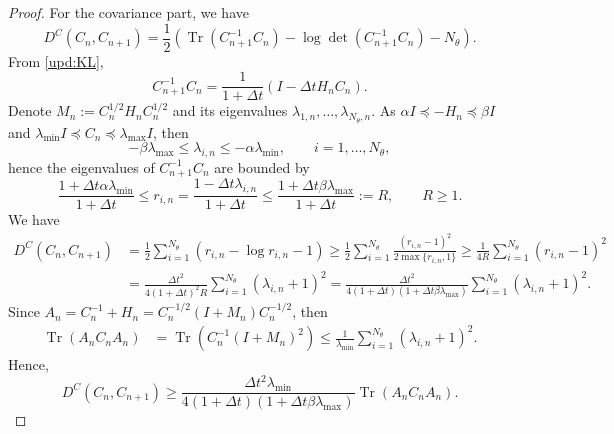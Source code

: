 \documentclass[11pt]{article}
\theoremstyle{plain}
\theoremstyle{definition}
\theoremstyle{remark}
\newcommand{\Tr}{\operatorname{Tr}}
\begin{document}
\begin{proof}
    For the covariance part, we have
    \begin{equation*}
        D^C (C_n, C_{n+1}) = \frac{1}{2} (\Tr(C_{n+1}^{-1} C_n) - \log \det (C_{n+1}^{-1} C_n) - N_\theta).
    \end{equation*}
    From \eqref{upd:KL}, 
    \begin{equation*}
        C_{n+1}^{-1} C_n = \frac{1}{1 + \Delta t} (I - \Delta t H_n C_n).
    \end{equation*}
    Denote $M_n := C_n^{1/2} H_n C_n^{1/2}$ and its eigenvalues $\lambda_{1, n}, \ldots, \lambda_{N_\theta, n}$. As $\alpha I \preceq - H_n \preceq \beta I$ and $\lambda_{\min} I \preceq C_n \preceq \lambda_{\max} I$, then 
    \begin{equation*}
        - \beta \lambda_{\max} \leq \lambda_{i, n} \leq -\alpha \lambda_{\min}, \qquad i = 1, \ldots, N_\theta,
    \end{equation*}
    hence the eigenvalues of $C_{n+1}^{-1} C_n$ are bounded by
    \begin{equation*}
         \frac{1 + \Delta t \alpha \lambda_{\min}}{1 + \Delta t} \leq r_{i, n} = \frac{1 - \Delta t \lambda_{i, n}}{1 + \Delta t} \leq \frac{1 + \Delta t \beta \lambda_{\max}}{1 + \Delta t} := R, \qquad R \geq 1.
    \end{equation*}
    We have
    \begin{align*}
        D^C (C_{n}, C_{n+1}) &= \frac{1}{2} \sum_{i = 1}^{N_\theta} (r_{i, n} - \log r_{i, n} - 1) \geq \frac{1}{2} \sum_{i = 1}^{N_\theta} \frac{(r_{i, n} - 1)^2}{2\max \{r_{i, n}, 1\}} \geq \frac{1}{4R} \sum_{i=1}^{N_\theta} (r_{i, n} - 1)^2 \\
        &= \frac{\Delta t^2}{4 (1 + \Delta t)^2 R} \sum_{i=1}^{N_\theta} (\lambda_{i, n} + 1)^2 = \frac{\Delta t^2}{4 (1 + \Delta t) (1 + \Delta t \beta \lambda_{\max})} \sum_{i=1}^{N_\theta} (\lambda_{i, n} + 1)^2.
    \end{align*}
    Since $A_n = C_n^{-1} + H_n = C_n^{-1/2} (I + M_n) C_n^{-1/2}$, then 
    \begin{align*}
        \Tr(A_n C_n A_n) &= \Tr (C_n^{-1} (I + M_n)^2) \leq \frac{1}{\lambda_{\min}} \sum_{i=1}^{N_\theta} (\lambda_{i, n} + 1)^2.
    \end{align*}
    Hence, \begin{equation*}
        D^C (C_n, C_{n+1}) \geq \frac{\Delta t^2 \lambda_{\min}}{4 (1 + \Delta t) (1 + \Delta t \beta \lambda_{\max})} \Tr (A_n C_n A_n).
    \end{equation*}


\end{proof}
\end{document}
